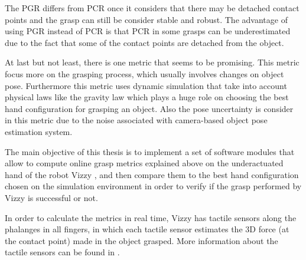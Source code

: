 The PGR differs from PCR once it considers that there may be detached contact points and the grasp can still be consider stable and robust. The advantage of using PGR instead of PCR is that PCR in some grasps can be underestimated due to the fact that some of the contact points are detached from the object.
\par
At last but not least, there is one metric that seems to be promising. This metric \cite{kim2013physically} focus more on the grasping process, which usually involves changes on object pose. Furthermore this metric uses dynamic simulation that take into account physical laws like the gravity law which plays a huge role on choosing the best hand configuration for grasping an object. Also the pose uncertainty is consider in this metric due to the noise associated with camera-based object pose estimation system. 
\par
The main objective of this thesis is to implement a set of software modules that allow to compute online grasp metrics explained above on the underactuated hand of the robot Vizzy \cite{moreno2016vizzy}, and then compare them to the best hand configuration chosen on the simulation environment in order to verify if the grasp performed by Vizzy is successful or not.
\par
In order to calculate the metrics in real time, Vizzy has tactile sensors along the phalanges in all fingers, in which each tactile sensor estimates the 3D force (at the contact point) made in the object grasped. More information about the tactile sensors can be found in \cite{paulino2017low}.
